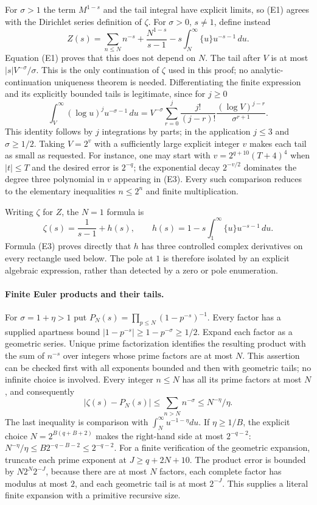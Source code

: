 For $\sigma>1$ the term $M^{1-s}$ and the tail integral have explicit
limits, so (E1) agrees with the Dirichlet series definition of $\zeta$.
For $\sigma>0$, $s\ne1$, define instead
\[
 Z(s)=\sum_{n\le N}n^{-s}+\frac{N^{1-s}}{s-1}
       -s\int_N^\infty\{u\}u^{-s-1}\,du.                   \tag{E2}
\]
Equation (E1) proves that this does not depend on $N$. The tail after $V$
is at most $|s|V^{-\sigma}/\sigma$. This is the only continuation of
$\zeta$ used in this proof; no analytic-continuation uniqueness theorem is
needed. Differentiating the finite expression and its explicitly bounded
tails is legitimate, since for $j\ge0$
\[
 \int_V^\infty (\log u)^j u^{-\sigma-1}\,du
 =V^{-\sigma}\sum_{r=0}^j
     \frac{j!}{(j-r)!}\frac{(\log V)^{j-r}}{\sigma^{r+1}}.    \tag{E3}
\]
This identity follows by $j$ integrations by parts; in the application
$j\le3$ and $\sigma\ge1/2$. Taking $V=2^v$ with a sufficiently large
explicit integer $v$ makes each tail as small as requested. For instance,
one may start with $v=2^{q+10}(T+4)^4$ when $|t|\le T$ and the desired
error is $2^{-q}$; the exponential decay $2^{-v/2}$ dominates the degree
three polynomial in $v$ appearing in (E3). Every such comparison reduces
to the elementary inequalities $n\le2^n$ and finite multiplication.

Writing $\zeta$ for $Z$, the $N=1$ formula is
\[
 \zeta(s)=\frac1{s-1}+h(s),\qquad
 h(s)=1-s\int_1^\infty\{u\}u^{-s-1}\,du.                   \tag{E4}
\]
Formula (E3) proves directly that $h$ has three controlled complex
derivatives on every rectangle used below. The pole at $1$ is therefore
isolated by an explicit algebraic expression, rather than detected by a
zero or pole enumeration.

\paragraph{Finite Euler products and their tails.}
For $\sigma=1+\eta>1$ put
$P_N(s)=\prod_{p\le N}(1-p^{-s})^{-1}$. Every factor has a supplied
apartness bound $|1-p^{-s}|\ge1-p^{-\sigma}\ge1/2$.
Expand each factor as a geometric series. Unique prime factorization
identifies the resulting product with the sum of $n^{-s}$ over integers
whose prime factors are at most $N$. This assertion can be checked first
with all exponents bounded and then with geometric tails; no infinite
choice is involved. Every integer $n\le N$ has all its prime factors at
most $N$, and consequently
\[
        |\zeta(s)-P_N(s)|\le \sum_{n>N}n^{-\sigma}
                    \le N^{-\eta}/\eta.                   \tag{E5}
\]
The last inequality is comparison with $\int_N^\infty u^{-1-\eta}du$.
If $\eta\ge1/B$, the explicit choice
$N=2^{B(q+B+2)}$ makes the right-hand side at most $2^{-q-2}$:
$N^{-\eta}/\eta\le B2^{-q-B-2}\le2^{-q-2}$.
For a finite verification of the geometric expansion, truncate each prime
exponent at $J\ge q+2N+10$. The product error is bounded by
$N2^N2^{-J}$, because there are at most $N$ factors, each complete factor
has modulus at most $2$, and each geometric tail is at most $2^{-J}$.
This supplies a literal finite expansion with a primitive recursive size.

